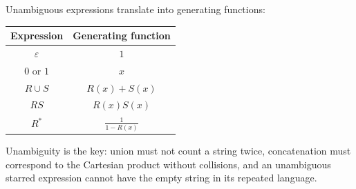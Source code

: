 Unambiguous expressions translate into generating functions:
\begin{center}
\begin{tabular}{c|c}
Expression & Generating function \\
\hline
$\varepsilon$ & $1$ \\
$0$ or $1$ & $x$ \\
$R\cup S$ & $R(x)+S(x)$ \\
$RS$ & $R(x)S(x)$ \\
$R^*$ & $\displaystyle\frac1{1-R(x)}$
\end{tabular}
\end{center}
\begin{remark}
Unambiguity is the key: union must not count a string twice, concatenation must correspond to the Cartesian product without collisions, and an unambiguous starred expression cannot have the empty string in its repeated language.
\end{remark}

